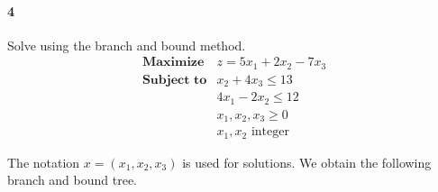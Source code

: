 \documentclass[12pt]{article}
\newenvironment{fullbox}{\begin{lrbox}{\savefullbox}\begin{minipage}{\dimexpr\textwidth-2\fboxsep\relax}}{\end{minipage}\end{lrbox}\begin{center}\framebox[\textwidth]{\usebox{\savefullbox}}\end{center}}
\newenvironment{pbox}[1][]{\begin{fullbox}\ifx#1\empty\else\paragraph{#1}\fi}{\end{fullbox}}
\theoremstyle{definition}
\begin{document}
\thispagestyle{title}


\begin{pbox}[4]
    Solve using the branch and bound method.
    \[\begin{array}{ll}
        \textbf{Maximize} & z = 5x_1 + 2x_2 - 7x_3 \\
        \textbf{Subject to}
            & x_2 + 4x_3 \leq 13 \\
            & 4x_1 - 2x_2 \leq 12 \\
            & x_1, x_2, x_3 \geq 0 \\
            & x_1, x_2 \text{ integer}
    \end{array}\]
\end{pbox}


The notation $x = (x_1, x_2, x_3)$ is used for solutions. We obtain the following branch and bound tree.

\vspace{1em}
\vspace{1em}
\end{document}

